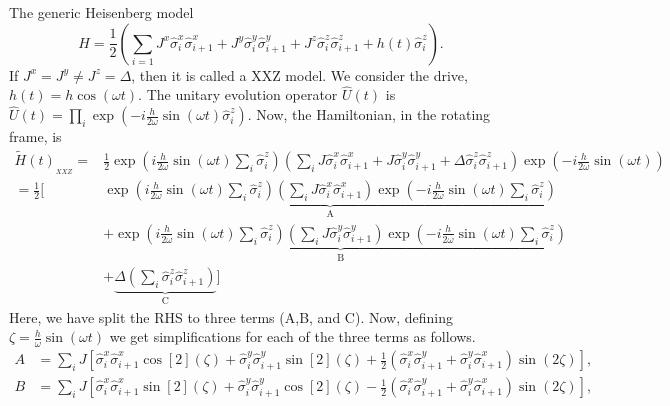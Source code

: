 \documentclass[aps,prb,reprint,showpacs,floatfix,superscriptaddress, onecolumn, nofootinbib, 9pt]{revtex4-2}
\begin{document}
\begin{enumerate}
{			The generic Heisenberg model
			\begin{equation*}
				H = \frac12 \left( \sum_{i=1} J^x \hat{\sigma}^x_i \hat{\sigma}^x_{i+1} +J^y  \hat{\sigma}^y_i \hat{\sigma}^y_{i+1} + J^z  \hat{\sigma}^z_i \hat{\sigma}^z_{i+1} + h(t)  \hat{\sigma}^z_i\right).
				\label{eq:heisenberg_model}
			\end{equation*}
			If $J^x= J^y \neq J^z=\Delta$, then it is called a XXZ model. We consider the drive, $h(t) = h \cos(\omega t)$. The unitary evolution operator $\displaystyle \hat{U}(t)$ is $\hat{U}(t)=\prod_{i} \exp \left(-i \frac{h}{2 \omega} \sin (\omega t) \hat{\sigma}_{i}^{z}\right)$. Now, the Hamiltonian, in the rotating frame, is
			\begin{align}
				\tilde{H}(t)_{_{XXZ}}= & \frac{1}{2} \exp \left(i \frac{h}{2 \omega} \sin (\omega t) \sum_{i} \hat{\sigma}_{i}^{z}\right)\left(\sum_{i} J \hat{\sigma}^x_i \hat{\sigma}^x_{i+1} + J \hat{\sigma}^y_i \hat{\sigma}^y_{i+1}+ \Delta  \hat{\sigma}^z_i \hat{\sigma}^z_{i+1}\right) \exp \left(-i \frac{h}{2 \omega} \sin (\omega t)\right)\nonumber\\
				= \frac12 \Bigg[& \underbrace{\exp \left(i \frac{h}{2 \omega} \sin (\omega t) \sum_{i} \hat{\sigma}_{i}^{z}\right)\left(\sum_{i} J \hat{\sigma}_{i}^{x} \hat{\sigma}_{i+1}^{x}\right) \exp \left(-i \frac{h}{2 \omega} \sin (\omega t) \sum_i\hat{\sigma}_{i}^{z}\right)}_{\mathrm{A}} \nonumber\\
				& +\underbrace{\exp \left(i \frac{h}{2 \omega} \sin (\omega t) \sum_{i} \hat{\sigma}_{i}^{z}\right)\left(\sum_{i} J \hat{\sigma}_{i}^{y} \hat{\sigma}_{i+1}^{y}\right) \exp \left(-i \frac{h}{2 \omega} \sin (\omega t) \sum_i\hat{\sigma}_{i}^{z}\right)}_{\mathrm{B}} \nonumber\\
				& +\underbrace{\Delta \left(\sum_{i}  \hat{\sigma}_{i}^{z} \hat{\sigma}_{i+1}^{z}\right)}_{\mathrm{C}}\Bigg]
				\label{eq:xxz1}
			\end{align}
			Here, we have split the RHS to three terms (A,B, and C). Now, defining $\zeta = \frac{h}{\omega}\sin(\omega t)$ we get simplifications for each of the three terms as follows.
			\begin{align}
				A &= \sum_{i} J \left[ \hat{\sigma}^x_i \hat{\sigma}^x_{i+1} \cos[2](\zeta) + \hat{\sigma}^y_i \hat{\sigma}^y_{i+1} \sin[2](\zeta)+ \frac12\left(\hat{\sigma}^x_i \hat{\sigma}^y_{i+1} + \hat{\sigma}^y_i \hat{\sigma}^x_{i+1}\right)\sin(2\zeta)\right],
				\nonumber\\
				B &= \sum_{i} J \left[ \hat{\sigma}^x_i \hat{\sigma}^x_{i+1} \sin[2](\zeta) + \hat{\sigma}^y_i \hat{\sigma}^y_{i+1} \cos[2](\zeta)- \frac12\left(\hat{\sigma}^x_i \hat{\sigma}^y_{i+1} + \hat{\sigma}^y_i \hat{\sigma}^x_{i+1}\right)\sin(2\zeta)\right],

\end{align}}
\end{enumerate}
\end{document}
